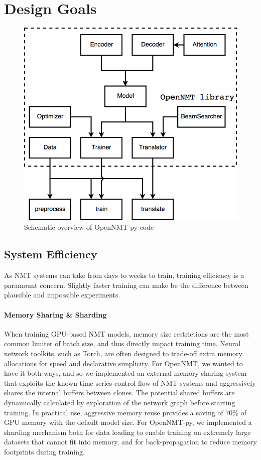 \documentclass[]{article}
\begin{document}
\section{Design Goals}
\begin{figure}[t]
        \centering
        \includegraphics[scale=0.3]{OpenNMTDiagram.png}
        \caption{\label{fig:codestruct}Schematic overview of OpenNMT-py code}
    \end{figure}
\subsection{System Efficiency}

As NMT systems can take from days to weeks to train, training
efficiency is a paramount concern. Slightly faster training can make be the difference between
plausible and impossible experiments.

\paragraph{Memory Sharing \& Sharding}

When training GPU-based NMT models, memory size restrictions are the
most common limiter of batch size, and thus directly impact training
time. Neural network toolkits, such as Torch, are often designed to
trade-off extra memory allocations for speed and declarative
simplicity. For OpenNMT, we wanted to have it both ways, and so we
implemented an external memory sharing system that exploits the known
time-series control flow of NMT systems and aggressively shares the
internal buffers between clones. The potential shared buffers are
dynamically calculated by exploration of the network graph before
starting training. In practical use, aggressive memory reuse provides
a saving of 70\% of GPU memory with the default model size. For OpenNMT-py, we implemented a sharding mechanism both for data loading to enable training on extremely large datasets that cannot fit into memory, and for back-propagation to reduce memory footprints during training.
\end{document}
